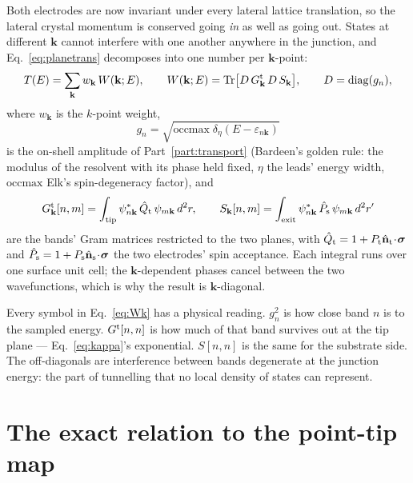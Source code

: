 \documentclass[11pt]{article}
\begin{document}
Both electrodes are now invariant under every lateral lattice translation, so
the lateral crystal momentum is conserved going \emph{in} as well as going
out. States at different $\mathbf k$ cannot interfere with one another
anywhere in the junction, and Eq.~\eqref{eq:planetrans} decomposes into one
number per $\mathbf k$-point:
\begin{equation}
  T(E)=\sum_{\mathbf k} w_{\mathbf k}\,W(\mathbf k;E),
  \qquad
  W(\mathbf k;E)=\mathrm{Tr}\big[D\,G^{\rm t}_{\mathbf k}\,D\,S_{\mathbf k}\big],
  \qquad
  D=\mathrm{diag}(g_n),
  \label{eq:Wk}
\end{equation}
where $w_{\mathbf k}$ is the $k$-point weight,
\begin{equation}
  g_n=\sqrt{\mathrm{occmax}\;\delta_\eta\!\left(E-\varepsilon_{n\mathbf k}\right)}
  \label{eq:onshell}
\end{equation}
is the on-shell amplitude of Part~\ref{part:transport} (Bardeen's golden
rule: the modulus of the resolvent with its phase held fixed, $\eta$ the
leads' energy width, $\mathrm{occmax}$ Elk's spin-degeneracy factor), and
\begin{equation}
  G^{\rm t}_{\mathbf k}[n,m]=\int_{\rm tip}\psi^*_{n\mathbf k}\,\hat Q_{\rm t}\,
    \psi_{m\mathbf k}\,d^2r,
  \qquad
  S_{\mathbf k}[n,m]=\int_{\rm exit}\psi^*_{n\mathbf k}\,\hat P_{\rm s}\,
    \psi_{m\mathbf k}\,d^2r'
  \label{eq:grams}
\end{equation}
are the bands' Gram matrices restricted to the two planes, with $\hat Q_{\rm
t}=1+P_{\rm t}\hat{\mathbf n}_{\rm t}\!\cdot\!\boldsymbol\sigma$ and $\hat
P_{\rm s}=1+P_{\rm s}\hat{\mathbf n}_{\rm s}\!\cdot\!\boldsymbol\sigma$ the
two electrodes' spin acceptance. Each integral runs over one surface unit
cell; the $\mathbf k$-dependent phases cancel between the two wavefunctions,
which is why the result is $\mathbf k$-diagonal.

Every symbol in Eq.~\eqref{eq:Wk} has a physical reading. $g_n^2$ is how close
band $n$ is to the sampled energy. $G^{\rm t}[n,n]$ is how much of that band
survives out at the tip plane --- Eq.~\eqref{eq:kappa}'s exponential.
$S[n,n]$ is the same for the substrate side. The off-diagonals are
interference between bands degenerate at the junction energy: the part of
tunnelling that no local density of states can represent.

\section{The exact relation to the point-tip map}
\end{document}
